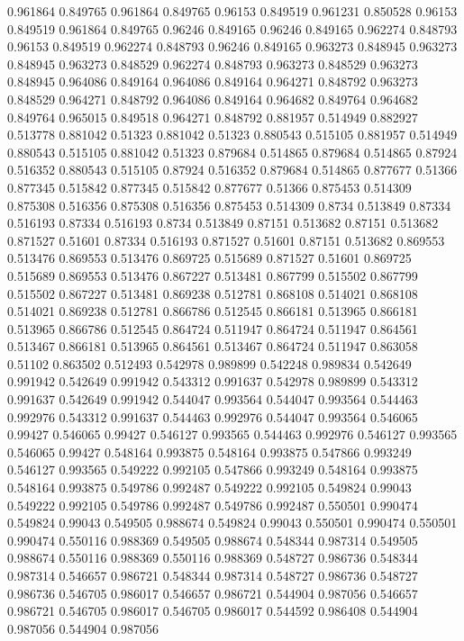 0.961864 0.849765
0.961864 0.849765
0.96153 0.849519
0.961231 0.850528
0.96153 0.849519
0.961864 0.849765
0.96246 0.849165
0.96246 0.849165
0.962274 0.848793
0.96153 0.849519
0.962274 0.848793
0.96246 0.849165
0.963273 0.848945
0.963273 0.848945
0.963273 0.848529
0.962274 0.848793
0.963273 0.848529
0.963273 0.848945
0.964086 0.849164
0.964086 0.849164
0.964271 0.848792
0.963273 0.848529
0.964271 0.848792
0.964086 0.849164
0.964682 0.849764
0.964682 0.849764
0.965015 0.849518
0.964271 0.848792
0.881957 0.514949
0.882927 0.513778
0.881042 0.51323
0.881042 0.51323
0.880543 0.515105
0.881957 0.514949
0.880543 0.515105
0.881042 0.51323
0.879684 0.514865
0.879684 0.514865
0.87924 0.516352
0.880543 0.515105
0.87924 0.516352
0.879684 0.514865
0.877677 0.51366
0.877345 0.515842
0.877345 0.515842
0.877677 0.51366
0.875453 0.514309
0.875308 0.516356
0.875308 0.516356
0.875453 0.514309
0.8734 0.513849
0.87334 0.516193
0.87334 0.516193
0.8734 0.513849
0.87151 0.513682
0.87151 0.513682
0.871527 0.51601
0.87334 0.516193
0.871527 0.51601
0.87151 0.513682
0.869553 0.513476
0.869553 0.513476
0.869725 0.515689
0.871527 0.51601
0.869725 0.515689
0.869553 0.513476
0.867227 0.513481
0.867799 0.515502
0.867799 0.515502
0.867227 0.513481
0.869238 0.512781
0.868108 0.514021
0.868108 0.514021
0.869238 0.512781
0.866786 0.512545
0.866181 0.513965
0.866181 0.513965
0.866786 0.512545
0.864724 0.511947
0.864724 0.511947
0.864561 0.513467
0.866181 0.513965
0.864561 0.513467
0.864724 0.511947
0.863058 0.51102
0.863502 0.512493
0.542978 0.989899
0.542248 0.989834
0.542649 0.991942
0.542649 0.991942
0.543312 0.991637
0.542978 0.989899
0.543312 0.991637
0.542649 0.991942
0.544047 0.993564
0.544047 0.993564
0.544463 0.992976
0.543312 0.991637
0.544463 0.992976
0.544047 0.993564
0.546065 0.99427
0.546065 0.99427
0.546127 0.993565
0.544463 0.992976
0.546127 0.993565
0.546065 0.99427
0.548164 0.993875
0.548164 0.993875
0.547866 0.993249
0.546127 0.993565
0.549222 0.992105
0.547866 0.993249
0.548164 0.993875
0.548164 0.993875
0.549786 0.992487
0.549222 0.992105
0.549824 0.99043
0.549222 0.992105
0.549786 0.992487
0.549786 0.992487
0.550501 0.990474
0.549824 0.99043
0.549505 0.988674
0.549824 0.99043
0.550501 0.990474
0.550501 0.990474
0.550116 0.988369
0.549505 0.988674
0.548344 0.987314
0.549505 0.988674
0.550116 0.988369
0.550116 0.988369
0.548727 0.986736
0.548344 0.987314
0.546657 0.986721
0.548344 0.987314
0.548727 0.986736
0.548727 0.986736
0.546705 0.986017
0.546657 0.986721
0.544904 0.987056
0.546657 0.986721
0.546705 0.986017
0.546705 0.986017
0.544592 0.986408
0.544904 0.987056
0.544904 0.987056
